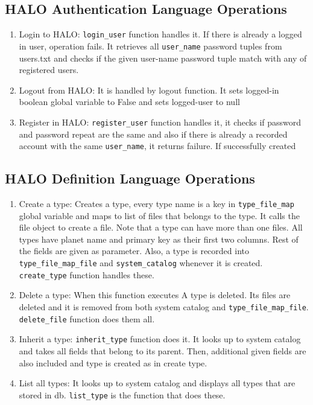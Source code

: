 \documentclass{article}
\begin{document}
\subsection{HALO Authentication Language Operations}
\begin{enumerate}
    \item Login to HALO: \texttt{login\_user} function handles it. If there is already a logged in user, operation fails. It retrieves all \texttt{user\_name} password tuples from users.txt and checks if the given user-name password tuple match with any of registered users.
    \item Logout from HALO: It is handled by logout function. It sets logged-in boolean global variable to False and sets logged-user to null
    \item Register in HALO: \texttt{register\_user} function handles it, it checks if password and password repeat are the same and also if there is already a recorded account with the same \texttt{user\_name}, it returns failure. If successfully created 
\end{enumerate}
\subsection{HALO Definition Language Operations}
\begin{enumerate}
    \item Create a type:
    Creates a type, every type name is a key in \texttt{type\_file\_map} global variable and maps to list of files that belongs to the type. It calls the file object to create a file. Note that a type can have more than one files. All types have planet name and primary key as their first two columns. Rest of the fields are given as parameter. Also, a type is recorded into \texttt{type\_file\_map\_file} and \texttt{system\_catalog} whenever it is created. \texttt{create\_type} function handles these.
    \item Delete a type: When this function executes A type is deleted. Its files are deleted and it is removed from both system catalog and \texttt{type\_file\_map\_file}. \texttt{delete\_file} function does them all.
    \item Inherit a type: \texttt{inherit\_type} function does it. It looks up to system catalog and takes all fields that belong to its parent. Then, additional given fields are also included and type is created as in create type.
    \item List all types: It looks up to system catalog and displays all types that are stored in db. \texttt{list\_type} is the function that does these.
\end{enumerate}
\end{document}
